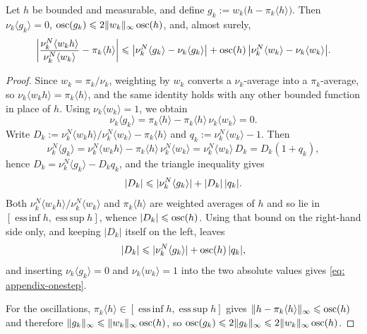 \documentclass{article}
\begin{document}
\begin{lemma}
\label{lem: onestep}
Let $h$ be bounded and measurable, and define $g_k := w_k\bigl(h-\pi_k\langle h\rangle\bigr)$. Then $\nu_k\langle g_k\rangle=0$, $\operatorname{osc}(g_k)\leqslant2\lVert w_k\rVert_\infty\operatorname{osc}(h)$, and, almost surely,
\begin{equation}
    \biggl|\frac{\nu_k^N\langle w_kh\rangle}{\nu_k^N\langle w_k\rangle}-\pi_k\langle h\rangle\biggr|
    \leqslant \bigl|\nu_k^N\langle g_k\rangle-\nu_k\langle g_k\rangle\bigr|
    + \operatorname{osc}(h)\,\bigl|\nu_k^N\langle w_k\rangle-\nu_k\langle w_k\rangle\bigr| .
    \label{eq: appendix-onestep}
\end{equation}
\end{lemma}

\begin{proof}
Since $w_k=\pi_k/\nu_k$, weighting by $w_k$ converts a $\nu_k$-average into a $\pi_k$-average, so $\nu_k\langle w_kh\rangle=\pi_k\langle h\rangle$, and the same identity holds with any other bounded function in place of $h$. Using $\nu_k\langle w_k\rangle=1$, we obtain
\begin{equation*}
    \nu_k\langle g_k\rangle = \pi_k\langle h\rangle - \pi_k\langle h\rangle\,\nu_k\langle w_k\rangle = 0 .
\end{equation*}
Write $D_k := \nu_k^N\langle w_kh\rangle/\nu_k^N\langle w_k\rangle-\pi_k\langle h\rangle$ and $q_k := \nu_k^N\langle w_k\rangle-1$. Then
\begin{equation*}
    \nu_k^N\langle g_k\rangle = \nu_k^N\langle w_kh\rangle - \pi_k\langle h\rangle\,\nu_k^N\langle w_k\rangle
    = \nu_k^N\langle w_k\rangle\,D_k = D_k(1+q_k) ,
\end{equation*}
hence $D_k = \nu_k^N\langle g_k\rangle-D_kq_k$, and the triangle inequality gives
\begin{equation*}
    |D_k|\leqslant|\nu_k^N\langle g_k\rangle|+|D_k|\,|q_k| .
\end{equation*}
Both $\nu_k^N\langle w_kh\rangle/\nu_k^N\langle w_k\rangle$ and $\pi_k\langle h\rangle$ are weighted averages of $h$ and so lie in $[\operatorname{ess\,inf}h,\operatorname{ess\,sup}h]$, whence $|D_k|\leqslant\operatorname{osc}(h)$. Using that bound on the right-hand side only, and keeping $|D_k|$ itself on the left, leaves
\begin{equation*}
    |D_k|\leqslant|\nu_k^N\langle g_k\rangle|+\operatorname{osc}(h)\,|q_k| ,
\end{equation*}
and inserting $\nu_k\langle g_k\rangle=0$ and $\nu_k\langle w_k\rangle=1$ into the two absolute values gives \eqref{eq: appendix-onestep}.

For the oscillations, $\pi_k\langle h\rangle\in[\operatorname{ess\,inf}h,\operatorname{ess\,sup}h]$ gives $\lVert h-\pi_k\langle h\rangle\rVert_\infty\leqslant\operatorname{osc}(h)$ and therefore $\lVert g_k\rVert_\infty\leqslant\lVert w_k\rVert_\infty\operatorname{osc}(h)$, so $\operatorname{osc}(g_k)\leqslant2\lVert g_k\rVert_\infty\leqslant2\lVert w_k\rVert_\infty\operatorname{osc}(h)$.
\end{proof}
\end{document}
